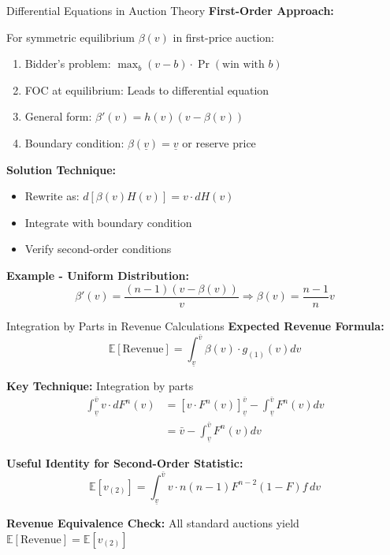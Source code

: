 \documentclass[xcolor={x11names}]{beamer}
\begin{document}
\begin{frame}{Differential Equations in Auction Theory}
\textbf{First-Order Approach:}

For symmetric equilibrium $\beta(v)$ in first-price auction:
\begin{enumerate}
  \item Bidder's problem: $\max_b (v-b) \cdot \Pr(\text{win with } b)$
  \item FOC at equilibrium: Leads to differential equation
  \item General form: $\beta'(v) = h(v)(v - \beta(v))$
  \item Boundary condition: $\beta(\underline{v}) = \underline{v}$ or reserve price
\end{enumerate}


\textbf{Solution Technique:}
\begin{itemize}
  \item Rewrite as: $d[\beta(v)H(v)] = v \cdot dH(v)$
  \item Integrate with boundary condition
  \item Verify second-order conditions
\end{itemize}


\textbf{Example - Uniform Distribution:}
\[\beta'(v) = \frac{(n-1)(v-\beta(v))}{v} \Rightarrow \beta(v) = \frac{n-1}{n}v\]
\end{frame}

\begin{frame}{Integration by Parts in Revenue Calculations}
\textbf{Expected Revenue Formula:}
\[\mathbb{E}[\text{Revenue}] = \int_{\underline{v}}^{\bar{v}} \beta(v) \cdot g_{(1)}(v)dv\]


\textbf{Key Technique:} Integration by parts
\begin{align*}
\int_{\underline{v}}^{\bar{v}} v \cdot dF^n(v) &= [v \cdot F^n(v)]_{\underline{v}}^{\bar{v}} - \int_{\underline{v}}^{\bar{v}} F^n(v)dv\\
&= \bar{v} - \int_{\underline{v}}^{\bar{v}} F^n(v)dv
\end{align*}


\textbf{Useful Identity for Second-Order Statistic:}
\[\mathbb{E}[v_{(2)}] = \int_{\underline{v}}^{\bar{v}} v \cdot n(n-1)F^{n-2}(1-F)f \, dv\]

\textbf{Revenue Equivalence Check:}
All standard auctions yield $\mathbb{E}[\text{Revenue}] = \mathbb{E}[v_{(2)}]$
\end{frame}

\end{document}
